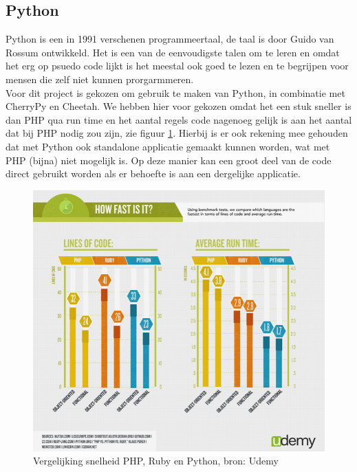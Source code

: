 \documentclass[twoside,openright]{uva-bachelor-thesis}
\begin{document}
			\subsection{Python}
				Python is een in 1991 verschenen programmeertaal, de taal is door Guido van Rossum ontwikkeld. Het is een van de eenvoudigste talen om te leren en omdat het erg op psuedo code lijkt is het meestal ook goed te lezen en te begrijpen voor mensen die zelf niet kunnen prorgarmmeren.
				\\[0.5cm]
			Voor dit project is gekozen om gebruik te maken van Python, in combinatie met CherryPy en Cheetah. We hebben hier voor gekozen omdat het een stuk sneller is dan PHP qua run time en het aantal regels code nagenoeg gelijk is aan het aantal dat bij PHP nodig zou zijn, zie figuur \ref{fig:phpvspython2}. Hierbij is er ook rekening mee gehouden dat met Python ook standalone applicatie gemaakt kunnen worden, wat met PHP (bijna) niet mogelijk is. Op deze manier kan een groot deel van de code direct gebruikt worden als er behoefte is aan een dergelijke applicatie.
			\begin{figure}[!htb]
				\centering
				\includegraphics[scale=0.9]{./img/phpvspython2.png}
				\caption{Vergelijking snelheid PHP, Ruby en Python, bron: Udemy}
				\label{fig:phpvspython2}
			\end{figure}
\end{document}
